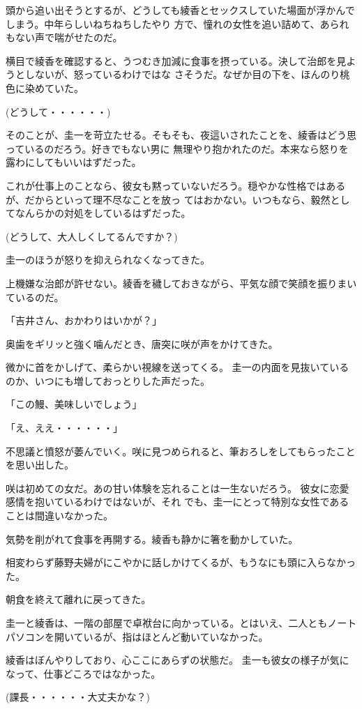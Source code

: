﻿\documentclass[book,tate]{jlreq}
\begin{document}
頭から追い出そうとするが、どうしても綾香とセックスしていた場面が浮かんでしまう。中年らしいねちねちしたやり 方で、憧れの女性を追い詰めて、あられもない声で喘がせたのだ。

横目で綾香を確認すると、うつむき加減に食事を摂っている。決して治郎を見ようとしないが、怒っているわけではな さそうだ。なぜか目の下を、ほんのり桃色に染めていた。

(どうして・・・・・・)

そのことが、圭一を苛立たせる。そもそも、夜這いされたことを、綾香はどう思っているのだろう。好きでもない男に 無理やり抱かれたのだ。本来なら怒りを露わにしてもいいはずだった。

これが仕事上のことなら、彼女も黙っていないだろう。穏やかな性格ではあるが、だからといって理不尽なことを放っ てはおかない。いつもなら、毅然としてなんらかの対処をしているはずだった。

(どうして、大人しくしてるんですか？)

圭一のほうが怒りを抑えられなくなってきた。

上機嫌な治郎が許せない。綾香を穢しておきながら、平気な顔で笑顔を振りまいているのだ。

「吉井さん、おかわりはいかが？」

奥歯をギリッと強く噛んだとき、唐突に咲が声をかけてきた。

微かに首をかしげて、柔らかい視線を送ってくる。 圭一の内面を見抜いているのか、いつにも増しておっとりした声だった。

「この鰻、美味しいでしょう」

「え、ええ・・・・・・」

不思議と憤怒が萎んでいく。咲に見つめられると、筆おろしをしてもらったことを思い出した。

咲は初めての女だ。あの甘い体験を忘れることは一生ないだろう。 彼女に恋愛感情を抱いているわけではないが、それ でも、圭一にとって特別な女性であることは間違いなかった。

気勢を削がれて食事を再開する。綾香も静かに箸を動かしていた。

相変わらず藤野夫婦がにこやかに話しかけてくるが、もうなにも頭に入らなかった。

朝食を終えて離れに戻ってきた。

圭一と綾香は、一階の部屋で卓袱台に向かっている。とはいえ、二人ともノートパソコンを開いているが、指はほとんど動いていなかった。

綾香はぼんやりしており、心ここにあらずの状態だ。 圭一も彼女の様子が気になって、仕事どころではなかった。

(課長・・・・・・大丈夫かな？)
\end{document}
